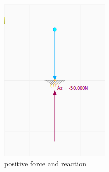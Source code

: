 \documentclass[a4paper,11pt]{report}
\begin{document}
\begin{minipage}[h]{0.3\textwidth}
\begin{figure}[H]
\begin{center}
\includegraphics[width=\textwidth]{../pictures/reactionforce.png}
\caption{positive force and reaction}
\label{pic:reactionforce}
\end{center}
\end{figure}
\end{minipage}
\hfill
\end{document}
